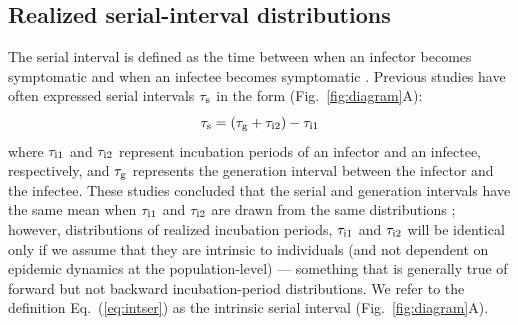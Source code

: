 \documentclass[12pt]{article}
\newcommand{\eref}[1]{Eq.~(\ref{eq:#1})}
\newcommand{\fref}[1]{Fig.~\ref{fig:#1}}
\newcommand{\gtime}{\tau_{\rm g}} %
\begin{document}
\subsection{Realized serial-interval distributions}

The serial interval is defined as the time between when an infector becomes symptomatic and when an infectee becomes symptomatic \citep{svensson2007note}.
Previous studies have often expressed serial intervals $\tau_{\rm s}$ in the form (\fref{diagram}A):
\begin{equation}
\tau_{\rm s} = (\gtime + \tau_{\rm i2}) - \tau_{\rm i1}
\label{eq:intser}
\end{equation}
where $\tau_{\rm i1}$ and $\tau_{\rm i2}$ represent incubation periods of an infector and
an infectee, respectively, and $\gtime$ represents the generation
interval between the infector and the infectee.
These studies concluded that the serial and generation intervals have the same mean when $\tau_{\rm i1}$ and $\tau_{\rm i2}$ are drawn from the same distributions \citep{svensson2007note,klinkenberg2011correlation,champredon2018equivalence, britton2019estimation};
however, distributions of realized incubation periods, $\tau_{\rm i1}$ and $\tau_{\rm i2}$ will be identical only if we assume that they are intrinsic to individuals (and not dependent on epidemic dynamics at the population-level) ---
something that is generally true of forward but not backward incubation-period distributions.
We refer to the definition \eref{intser} as the intrinsic serial interval (\fref{diagram}A).
\end{document}

